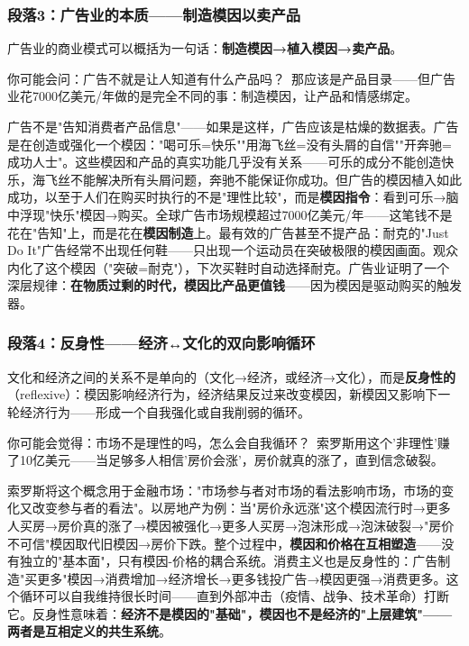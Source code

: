 \documentclass[../main.tex]{subfiles}
\begin{document}
	\subsubsection*{段落3：广告业的本质——制造模因以卖产品}

	广告业的商业模式可以概括为一句话：\textbf{制造模因→植入模因→卖产品}。

	\begin{tcolorbox}[colback=yellow!5, title=\textit{读者行为预测}]

		你可能会问：广告不就是让人知道有什么产品吗？\ 那应该是产品目录——但广告业花7000亿美元/年做的是完全不同的事：制造模因，让产品和情感绑定。

	\end{tcolorbox}

广告不是"告知消费者产品信息"——如果是这样，广告应该是枯燥的数据表。广告是在创造或强化一个模因："喝可乐=快乐""用海飞丝=没有头屑的自信""开奔驰=成功人士"。这些模因和产品的真实功能几乎没有关系——可乐的成分不能创造快乐，海飞丝不能解决所有头屑问题，奔驰不能保证你成功。但广告的模因植入如此成功，以至于人们在购买时执行的不是"理性比较"，而是\textbf{模因指令}：看到可乐→脑中浮现"快乐"模因→购买。全球广告市场规模超过7000亿美元/年——这笔钱不是花在"告知"上，而是花在\textbf{模因制造}上。最有效的广告甚至不提产品：耐克的"Just Do It"广告经常不出现任何鞋——只出现一个运动员在突破极限的模因画面。观众内化了这个模因（"突破=耐克"），下次买鞋时自动选择耐克。广告业证明了一个深层规律：\textbf{在物质过剩的时代，模因比产品更值钱}——因为模因是驱动购买的触发器。

	\subsubsection*{段落4：反身性——经济↔文化的双向影响循环}

	文化和经济之间的关系不是单向的（文化→经济，或经济→文化），而是\textbf{反身性的}（reflexive）：模因影响经济行为，经济结果反过来改变模因，新模因又影响下一轮经济行为——形成一个自我强化或自我削弱的循环。

	\begin{tcolorbox}[colback=yellow!5, title=\textit{读者行为预测}]

		你可能会觉得：市场不是理性的吗，怎么会自我循环？\ 索罗斯用这个'非理性'赚了10亿美元——当足够多人相信'房价会涨'，房价就真的涨了，直到信念破裂。

	\end{tcolorbox}

索罗斯将这个概念用于金融市场："市场参与者对市场的看法影响市场，市场的变化又改变参与者的看法"。以房地产为例：当"房价永远涨"这个模因流行时→更多人买房→房价真的涨了→模因被强化→更多人买房→泡沫形成→泡沫破裂→"房价不可信"模因取代旧模因→房价下跌。整个过程中，\textbf{模因和价格在互相塑造}——没有独立的"基本面"，只有模因-价格的耦合系统。消费主义也是反身性的：广告制造"买更多"模因→消费增加→经济增长→更多钱投广告→模因更强→消费更多。这个循环可以自我维持很长时间——直到外部冲击（疫情、战争、技术革命）打断它。反身性意味着：\textbf{经济不是模因的"基础"，模因也不是经济的"上层建筑"——两者是互相定义的共生系统}。
\end{document}
